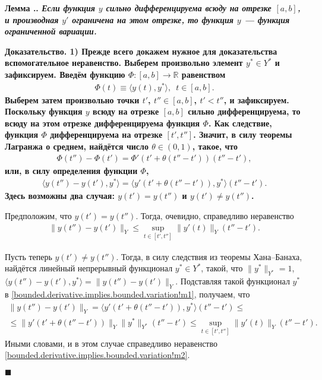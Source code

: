 \documentclass{report}
\newcounter{lem}[section]
\renewcommand{\thelem}{\thesection.\arabic{lem}}
\newenvironment{Lemma}{\par\refstepcounter{lem}\bf Лемма \thelem. \it}{\rm\par}
\newenvironment{Proof}{\par\noindent\bf Доказательство.\rm}{ $\blacksquare$\par}
\begin{document}
\begin{Lemma}
Если функция $y$ сильно дифференцируема всюду на отрезке $[a,b]$, и производная $y'$ ограничена на этом отрезке, то функция $y$ --- функция ограниченной вариации.
\end{Lemma}
\begin{Proof}
1) Прежде всего докажем нужное для доказательства вспомогательное неравенство. Выберем произвольно элемент $y^*\in Y^*$ и зафиксируем. Введём функцию $\Phi:[a,b]\to\mathbb{R}$ равенством
\begin{gather*}
\Phi(t)\equiv\langle y(t),y^*\rangle,\,\,\,t\in[a,b].
\end{gather*}
Выберем затем произвольно точки $t'$, $t''\in[a,b]$, $t'<t''$, и зафиксируем. Поскольку функция $y$ всюду на отрезке $[a,b]$ сильно дифференцируема, то всюду на этом отрезке дифференцируема
функция $\Phi$. Как следствие, функция $\Phi$ дифференцируема на отрезке $[t',t'']$. Значит, в силу теоремы Лагранжа о среднем, найдётся число $\theta\in(0,1)$, такое, что
\begin{gather*}
\Phi(t'')-\Phi(t')=\Phi'(t'+\theta(t''-t'))(t''-t'),
\end{gather*}
или, в силу определения функции $\Phi$,
\begin{gather}\label{bounded.derivative.implies.bounded.variation!m1}
\langle y(t'')-y(t'),y^*\rangle=\langle y'(t'+\theta(t''-t')),y^*\rangle(t''-t').
\end{gather}
Здесь возможны два случая: $y(t')=y(t'')$ и $y(t')\neq y(t'')$.

Предположим, что $y(t')=y(t'')$. Тогда, очевидно, справедливо неравенство
\begin{gather}\label{bounded.derivative.implies.bounded.variation!m2}
\|y(t'')-y(t')\|_Y\leqslant\sup\limits_{t\in[t',t'']}\|y'(t)\|_Y(t''-t').
\end{gather}

Пусть теперь $y(t')\neq y(t'')$. Тогда, в силу следствия из теоремы Хана--Банаха, найдётся линейный непрерывный функционал $y^*\in Y^*$, такой, что $\|y^*\|_{Y^*}=1$,
$\langle y(t'')-y(t'),y^*\rangle=\|y(t'')-y(t')\|_{Y}$. Подставляя такой функционал $y^*$ в \eqref{bounded.derivative.implies.bounded.variation!m1}, получаем, что
\begin{gather*}
\|y(t'')-y(t')\|_{Y}=\langle y'(t'+\theta(t''-t')),y^*\rangle(t''-t')\leqslant\\
\leqslant\|y'(t'+\theta(t''-t'))\|_Y\|y^*\|_{Y^*}(t''-t')\leqslant\sup\limits_{t\in[t',t'']}\|y'(t)\|_Y(t''-t').
\end{gather*}
Иными словами, и в этом случае справедливо неравенство \eqref{bounded.derivative.implies.bounded.variation!m2}.


\end{Proof}
\end{document}
